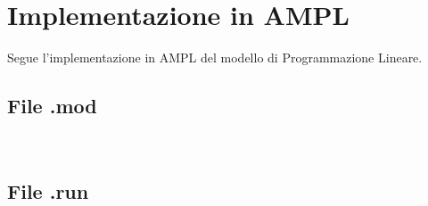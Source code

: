 


\section{Implementazione in AMPL}

Segue l'implementazione in AMPL del modello di Programmazione Lineare.

	\subsection{File .mod}
		\ \\
		
		\newpage

	\subsection{File .run}
		\ \\
		
		\newpage